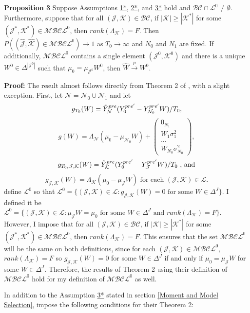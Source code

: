 \documentclass{article}
\begin{document}
\textbf{Proposition 3} Suppose Assumptions \hyperref[A1*]{1*}, \hyperref[A2*]{2*}, and \hyperref[A3*]{3*} hold and $\mathcal{BC} \cap \mathcal{L}^0 \ne \emptyset$. Furthermore, suppose that for all $(\mathcal{J},\mathcal{K}) \in \mathcal{BC}$, if $|\mathcal{K}| \geq |\mathcal{K}^*|$ for some $(\mathcal{J}^*,\mathcal{K}^*) \in \mathcal{MBCL}^0$, then $rank(\Lambda_{\mathcal{K}}) = F$. Then $P((\hat{\mathcal{J}},\hat{\mathcal{K}}) \in \mathcal{MBCL}^0) \rightarrow 1$ as $T_0 \rightarrow \infty$ and $N_0$ and $N_1$ are fixed. If additionally, $\mathcal{MBCL}^0$ contains a single element $(\mathcal{J}^0,\mathcal{K}^0)$ and there is a unique $W^0 \in \Delta^{|\mathcal{J}^0|}$ such that $\mu_0 = \mu_{\mathcal{J}^0} W^0$, then $\hat{W} \overset{p}{\rightarrow} W^0$. 

\textbf{Proof:} The result almost follows directly from Theorem 2 of \cite{MomentSelection}, with a slight exception.  First, let $\mathcal{N} = \mathcal{N}_0 \cup \mathcal{N}_1$ and let 
$$
g_{T_0}(W) = \Tilde{Y}_{\mathcal{N}}^{pre}(Y_0^{pre'} - Y_{\mathcal{N}_0}^{pre'}W)/T_0,$$
$$g(W) = \Lambda_{\mathcal{N}}(\mu_0 - \mu_{\mathcal{N}_0}W) + \begin{pmatrix}
    0_{N_1} \\
    W_1 \sigma_1^2 \\
    ... \\
    W_{N_0} \sigma_{N_0}^2
\end{pmatrix},$$ 
$$g_{T_0,\mathcal{J},\mathcal{K}}(W) = \Tilde{Y}_{\mathcal{K}}^{pre}(Y_0^{pre'} - Y_{\mathcal{J}}^{pre'}W)/T_0 \text{ , and}$$
$$g_{\mathcal{J},\mathcal{K}}(W) = \Lambda_{\mathcal{K}}(\mu_0 - \mu_{\mathcal{J}}W) \text{ for each }(\mathcal{J},\mathcal{K}) \in \mathcal{L}.$$
\cite{MomentSelection} define $\mathcal{L}^0$ so that $\mathcal{L}^0 = \{(\mathcal{J},\mathcal{K}) \in \mathcal{L} : g_{\mathcal{J},\mathcal{K}}(W) = 0 \text{ for some } W \in \Delta^J\}$. I defined it be $\mathcal{L}^0 = \{(\mathcal{J},\mathcal{K}) \in \mathcal{L} : \mu_{\mathcal{J}}W = \mu_0 \text{ for some } W \in \Delta^J \text{ and } rank(\Lambda_{\mathcal{K}}) = F \}$. However, I impose that for all $(\mathcal{J},\mathcal{K}) \in \mathcal{BC}$, if $|\mathcal{K}| \geq |\mathcal{K}^*|$ for some $(\mathcal{J}^*,\mathcal{K}^*) \in \mathcal{MBCL}^0$, then $rank(\Lambda_{\mathcal{K}}) = F$. This ensures that the set $\mathcal{MBCL}^0$ will be the same on both definitions, since for each $(\mathcal{J},\mathcal{K}) \in \mathcal{MBCL}^0$, $rank(\Lambda_{\mathcal{K}}) = F$ so $g_{\mathcal{J},\mathcal{K}}(W) = 0$ for some $W \in \Delta^J$ if and only if $\mu_0 = \mu_{\mathcal{J}}W$ for some $W \in \Delta^J$. Therefore, the results of Theorem 2 using their definition of $\mathcal{MBCL}^0$ hold for my definition of $\mathcal{MBCL}^0$ as well. 
\par 
In addition to the Assumption \hyperref[A3*]{3*} stated in section \ref{Moment and Model Selection}, \cite{MomentSelection} impose the following conditions for their Theorem 2:
\end{document}
